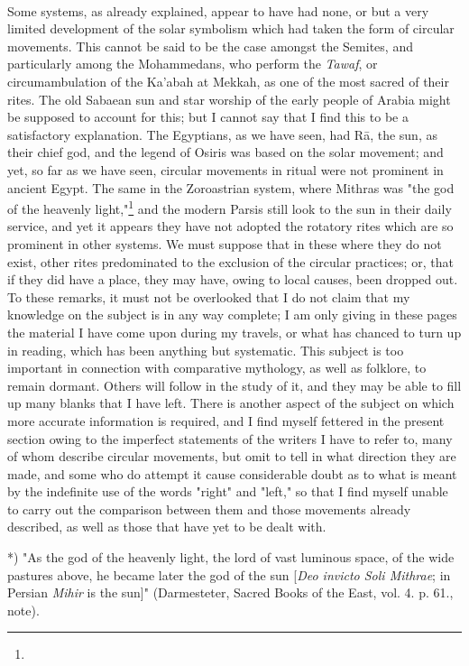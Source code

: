 \documentclass[a4paper, 11pt, oneside, polutonikogreek, english]{article}
\begin{document}
\paragraph{}
Some systems, as already explained, appear to have had none, or but a very limited development of the solar symbolism which had taken the form of circular movements. This cannot be said to be the case amongst the Semites, and particularly among the Mohammedans, who perform the \emph{Tawaf}, or circumambulation of the Ka'abah at Mekkah, as one of the most sacred of their rites. The old Sabaean sun and star worship of the early people of Arabia might be supposed to account for this; but I cannot say that I find this to be a satisfactory explanation. The Egyptians, as we have seen, had Rā, the sun, as their chief god, and the legend of Osiris was based on the solar movement; and yet, so far as we have seen, circular movements in ritual were not prominent in ancient Egypt. The same in the Zoroastrian system, where Mithras was "the god of the heavenly light,"\footnote{} and the modern Parsis still look to the sun in their daily service, and yet it appears they have not adopted the rotatory rites which are so prominent in other systems. We must suppose that in these where they do not exist, other rites predominated to the exclusion of the circular practices; or, that if they did have a place, they may have, owing to local causes, been dropped out. To these remarks, it must not be overlooked that I do not claim that my knowledge on the subject is in any way complete; I am only giving in these pages the material I have come upon during my travels, or what has chanced to turn up in reading, which has been anything but systematic. This subject is too important in connection with comparative mythology, as well as folklore, to remain dormant. Others will follow in the study of it, and they may be able to fill up many blanks that I have left. There is another aspect of the subject on which more accurate information is required, and I find myself fettered in the present section owing to the imperfect statements of the writers I have to refer to, many of whom describe circular movements, but omit to tell in what direction they are made, and some who do attempt it cause considerable doubt as to what is meant by the indefinite use of the words "right" and "left," so that I find myself unable to carry out the comparison between them and those movements already described, as well as those that have yet to be dealt with.

*) "As the god of the heavenly light, the lord of vast luminous space, of the wide pastures above, he became later the god of the sun [\emph{Deo invicto Soli Mithrae}; in Persian \emph{Mihir} is the sun]" (Darmesteter, Sacred Books of the East, vol. 4. p. 61., note).
\end{document}
